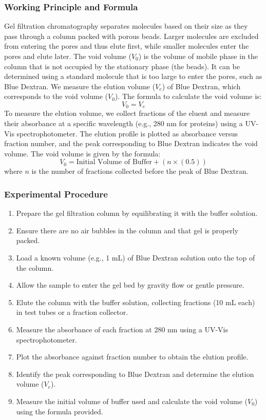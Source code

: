 \documentclass[openany]{book}
\begin{document}
\subsubsection{Working Principle and Formula}
Gel filtration chromatography separates molecules based on their size as they pass through a column packed with porous beads. Larger molecules are excluded from entering the pores and thus elute first, while smaller molecules enter the pores and elute later. The void volume ($V_0$) is the volume of mobile phase in the column that is not occupied by the stationary phase (the beads). It can be determined using a standard molecule that is too large to enter the pores, such as Blue Dextran. We measure the elution volume ($V_e$) of Blue Dextran, which corresponds to the void volume ($V_0$). The formula to calculate the void volume is:
$$V_0 = V_e$$
To measure the elution volume, we collect fractions of the eluent and measure their absorbance at a specific wavelength (e.g., 280 nm for proteins) using a UV-Vis spectrophotometer. The elution profile is plotted as absorbance versus fraction number, and the peak corresponding to Blue Dextran indicates the void volume.
The void volume is given by the formula: 
$$\boxed{V_0 = \text{Initial Volume of Buffer} + (n \times (0.5))}$$
where $n$ is the number of fractions collected before the peak of Blue Dextran.
\subsubsection{Experimental Procedure}
\begin{enumerate}
    \item Prepare the gel filtration column by equilibrating it with the buffer solution.
    \item Ensure there are no air bubbles in the column and that gel is properly packed.
    \item Load a known volume (e.g., 1 mL) of Blue Dextran solution onto the top of the column.
    \item Allow the sample to enter the gel bed by gravity flow or gentle pressure.
    \item Elute the column with the buffer solution, collecting fractions (10 mL each) in test tubes or a fraction collector.
    \item Measure the absorbance of each fraction at 280 nm using a UV-Vis spectrophotometer.
    \item Plot the absorbance against fraction number to obtain the elution profile.
    \item Identify the peak corresponding to Blue Dextran and determine the elution volume ($V_e$).
    \item Measure the initial volume of buffer used and calculate the void volume ($V_0$) using the formula provided.
\end{enumerate}
\end{document}
